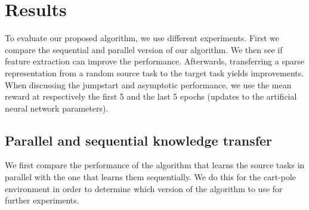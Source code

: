 \section{Results}
To evaluate our proposed algorithm, we use different experiments. First we compare the sequential and parallel version of our algorithm. We then see if feature extraction can improve the performance. Afterwards,  transferring a sparse representation from a random source task to the target task yields improvements.
When discussing the jumpstart and asymptotic performance, we use the mean reward at respectively the first 5 and the last 5 epochs (updates to the artificial neural network parameters).

\subsection{Parallel and sequential knowledge transfer} %
\label{sub:parallel_and_sequential_knowledge_transfer}
We first compare the performance of the algorithm that learns the source tasks in parallel with the one that learns them sequentially. We do this for the cart-pole environment in order to determine which version of the algorithm to use for further experiments.

